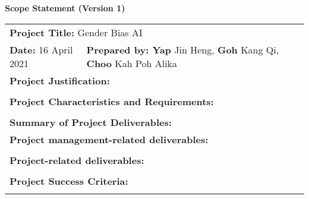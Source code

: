 \begin{center}
    \textbf{Scope Statement (Version 1)}
\end{center}

\begin{longtable}{ | p{} l | }
    \hline
    \multicolumn{2}{|l|}{\textbf{Project Title:} Gender Bias AI} \\
    \textbf{Date:} 16 April 2021 &
    \textbf{Prepared by: Yap} Jin Heng, \textbf{Goh} Kang Qi, \textbf{Choo} Kah Poh Alika \\
    \hline
    \multicolumn{2}{|l|}{\textbf{Project Justification: }} \\
    & \\
    \hline
    \multicolumn{2}{|l|}{\textbf{Project Characteristics and Requirements: }} \\
    & \\
    \hline
    \multicolumn{2}{|l|}{\textbf{Summary of Project Deliverables: }} \\
    \multicolumn{2}{|l|}{\textbf{Project management-related deliverables: }} \\
    & \\
    \multicolumn{2}{|l|}{\textbf{Project-related deliverables: }} \\
    & \\
    \hline
    \multicolumn{2}{|l|}{\textbf{Project Success Criteria: }} \\
    & \\
    \hline
\end{longtable}
